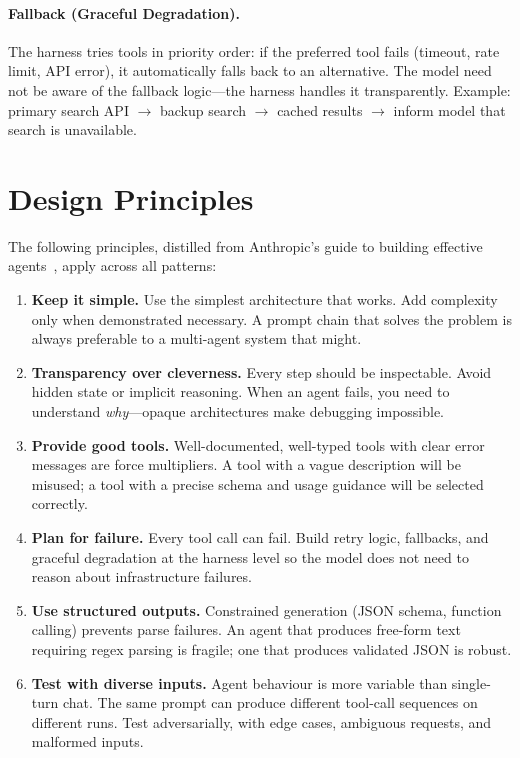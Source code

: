 \paragraph{Fallback (Graceful Degradation).}
\label{fallback-graceful-degradation.}

The harness tries tools in priority order: if the preferred tool fails (timeout, rate limit, API error), it automatically falls back to an alternative. The model need not be aware of the fallback logic---the harness handles it transparently. Example: primary search API $\to$ backup search $\to$ cached results $\to$ inform model that search is unavailable.

\section{Design Principles}
\label{design-principles}

The following principles, distilled from Anthropic’s guide to building effective agents~\cite{anthropic2024buildingagents}, apply across all patterns:

\begin{enumerate}
  \item \textbf{Keep it simple.} Use the simplest architecture that works. Add complexity only when demonstrated necessary. A prompt chain that solves the problem is always preferable to a multi-agent system that might.
  \item \textbf{Transparency over cleverness.} Every step should be inspectable. Avoid hidden state or implicit reasoning. When an agent fails, you need to understand \emph{why}---opaque architectures make debugging impossible.
  \item \textbf{Provide good tools.} Well-documented, well-typed tools with clear error messages are force multipliers. A tool with a vague description will be misused; a tool with a precise schema and usage guidance will be selected correctly.
  \item \textbf{Plan for failure.} Every tool call can fail. Build retry logic, fallbacks, and graceful degradation at the harness level so the model does not need to reason about infrastructure failures.
  \item \textbf{Use structured outputs.} Constrained generation (JSON schema, function calling) prevents parse failures. An agent that produces free-form text requiring regex parsing is fragile; one that produces validated JSON is robust.
  \item \textbf{Test with diverse inputs.} Agent behaviour is more variable than single-turn chat. The same prompt can produce different tool-call sequences on different runs. Test adversarially, with edge cases, ambiguous requests, and malformed inputs.
\end{enumerate}

